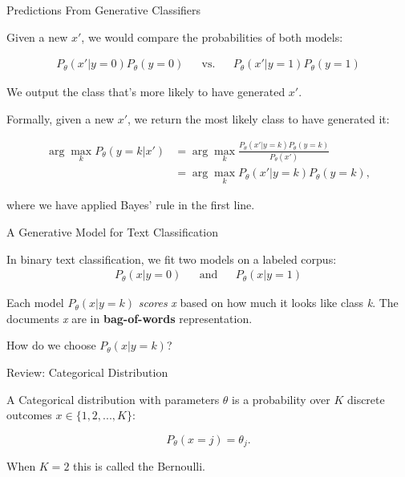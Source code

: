 \documentclass[../../generative_classifiers.tex]{subfiles}
\begin{document}
\begin{frame}[fragile]{Predictions From Generative Classifiers}


Given a new $x'$, we would compare the probabilities of both models:

\begin{align*}
P_\theta(x'|y=\text{0})P_\theta(y=\text{0}) && \text{vs.} && P_\theta(x'|y=\text{1})P_\theta(y=\text{1})
\end{align*}

We output the class that's more likely to have generated $x'$.


Formally, given a new $x'$, we return the most likely class to have generated it:

\begin{align*}
\arg \max_k P_\theta(y=k | x') & = \arg \max_k  \frac{P_\theta(x' | y=k) P_\theta(y=k)}{P_\theta(x')} \\
& = \arg \max_k P_\theta(x' | y=k) P_\theta(y=k),
\end{align*}

where we have applied Bayes' rule in the first line.

\end{frame}

\begin{frame}[fragile]{A Generative Model for Text Classification}


In binary text classification, we fit two models on a labeled corpus:
\begin{align*}
P_\theta(x|y=\text{0}) && \text{and} && P_\theta(x|y=\text{1})
\end{align*}


Each model $P_\theta(x | y=k)$ \textit{scores} \textit{x} based on how much it looks like class \textit{k}.
The documents \textit{x} are in \textbf{bag-of-words} representation.

\vspace{0.2cm}

How do we choose $P_\theta(x|y=k)$?
\end{frame}

\begin{frame}[fragile]{Review: Categorical Distribution}


A Categorical distribution with parameters $\theta$ is a probability
over $K$ discrete outcomes $x \in \{1,2,...,K\}$:

$$
P_\theta(x = j) = \theta_j.
$$

When $K=2$ this is called the Bernoulli.



\end{frame}
\end{document}
